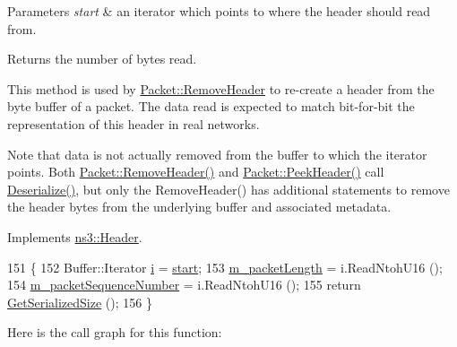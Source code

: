 \begin{DoxyParams}{Parameters}
{\em start} & an iterator which points to where the header should read from. \\
\hline
\end{DoxyParams}
\begin{DoxyReturn}{Returns}
the number of bytes read.
\end{DoxyReturn}
This method is used by \hyperlink{classns3_1_1Packet_a0961eccf975d75f902d40956c93ba63e}{Packet\+::\+Remove\+Header} to re-\/create a header from the byte buffer of a packet. The data read is expected to match bit-\/for-\/bit the representation of this header in real networks.

Note that data is not actually removed from the buffer to which the iterator points. Both \hyperlink{classns3_1_1Packet_a0961eccf975d75f902d40956c93ba63e}{Packet\+::\+Remove\+Header()} and \hyperlink{classns3_1_1Packet_aadc63487bea70945c418f4c3e9b81964}{Packet\+::\+Peek\+Header()} call \hyperlink{classns3_1_1olsr_1_1PacketHeader_a9fb8deaa2721ccea252b25b62d6f66ef}{Deserialize()}, but only the Remove\+Header() has additional statements to remove the header bytes from the underlying buffer and associated metadata. 

Implements \hyperlink{classns3_1_1Header_a78be9400bb66b2a8543606f395ef5396}{ns3\+::\+Header}.


\begin{DoxyCode}
151 \{
152   Buffer::Iterator \hyperlink{bernuolliDistribution_8m_a6f6ccfcf58b31cb6412107d9d5281426}{i} = \hyperlink{namespacevisualizer_1_1core_a2a35e5d8a34af358b508dac8635754e0}{start};
153   \hyperlink{classns3_1_1olsr_1_1PacketHeader_aa3a9c586f89ea634d60824846a6e5c94}{m\_packetLength}  = i.ReadNtohU16 ();
154   \hyperlink{classns3_1_1olsr_1_1PacketHeader_aba3c8769d2caacd2aa6e0ef8e2ad21ef}{m\_packetSequenceNumber} = i.ReadNtohU16 ();
155   \textcolor{keywordflow}{return} \hyperlink{classns3_1_1olsr_1_1PacketHeader_a58cc1688d4066443fc35384877dc79da}{GetSerializedSize} ();
156 \}
\end{DoxyCode}


Here is the call graph for this function\+:


